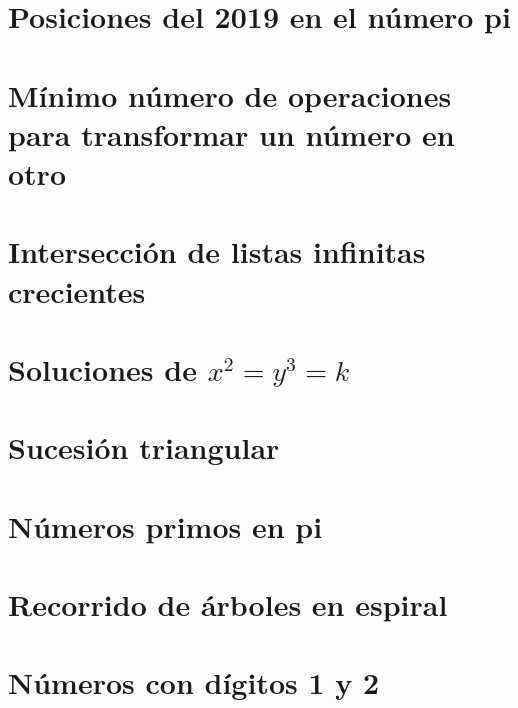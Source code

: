 \documentclass[a4paper,12pt,twoside]{book}
\begin{document}
\chapter{Posiciones del 2019 en el número pi}
\label{190117}

\chapter{Mínimo número de operaciones para transformar
  un número en otro}
\label{190118}


\chapter{Intersección de listas infinitas crecientes}
\label{190121}

\chapter{Soluciones de \(x^2 = y^3 = k\)}
\label{190122}

\chapter{Sucesión triangular}
\label{190123}

\chapter{Números primos en pi}
\label{190124}

\chapter{Recorrido de árboles en espiral}
\label{190125}


\chapter{Números con dígitos 1 y 2}
\label{190128}
\end{document}

